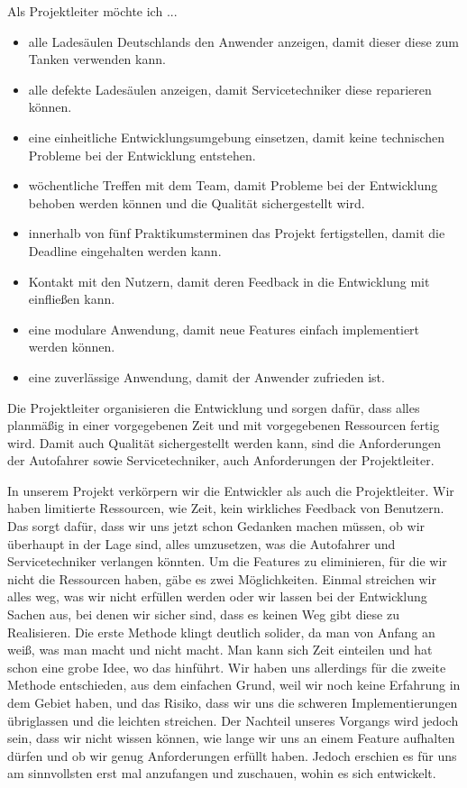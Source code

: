 \documentclass[utf8]{lni}
\begin{document}
Als Projektleiter möchte ich ...

\begin{itemize}
	\item alle Ladesäulen Deutschlands den Anwender anzeigen, damit dieser diese zum Tanken verwenden kann.
	\item alle defekte Ladesäulen anzeigen, damit Servicetechniker diese reparieren können.
	\item eine einheitliche Entwicklungsumgebung einsetzen, damit keine technischen Probleme bei der Entwicklung entstehen.
	\item wöchentliche Treffen mit dem Team, damit Probleme bei der Entwicklung behoben werden können und die Qualität sichergestellt wird.
	\item innerhalb von fünf Praktikumsterminen das Projekt fertigstellen, damit die Deadline eingehalten werden kann.
	\item Kontakt mit den Nutzern, damit deren Feedback in die Entwicklung mit einfließen kann.
	\item eine modulare Anwendung, damit neue Features einfach implementiert werden können.
	\item eine zuverlässige Anwendung, damit der Anwender zufrieden ist.
\end{itemize}

Die Projektleiter organisieren die Entwicklung und sorgen dafür, dass alles planmäßig in einer vorgegebenen Zeit und mit vorgegebenen Ressourcen fertig wird. Damit auch Qualität sichergestellt werden kann, sind die Anforderungen der Autofahrer sowie Servicetechniker, auch Anforderungen der Projektleiter.

In unserem Projekt verkörpern wir die Entwickler als auch die Projektleiter. Wir haben limitierte Ressourcen, wie Zeit, kein wirkliches Feedback von Benutzern. Das sorgt dafür, dass wir uns jetzt schon Gedanken machen müssen, ob wir überhaupt in der Lage sind, alles umzusetzen, was die Autofahrer und Servicetechniker verlangen könnten.
Um die Features zu eliminieren, für die wir nicht die Ressourcen haben, gäbe es zwei Möglichkeiten. Einmal streichen wir alles weg, was wir nicht erfüllen werden oder wir lassen bei der Entwicklung Sachen aus, bei denen wir sicher sind, dass es keinen Weg gibt diese zu Realisieren.
Die erste Methode klingt deutlich solider, da man von Anfang an weiß, was man macht und nicht macht. Man kann sich Zeit einteilen und hat schon eine grobe Idee, wo das hinführt. Wir haben uns allerdings für die zweite Methode entschieden, aus dem einfachen Grund, weil wir noch keine Erfahrung in dem Gebiet haben, und das Risiko, dass wir uns die schweren Implementierungen übriglassen und die leichten streichen. Der Nachteil unseres Vorgangs wird jedoch sein, dass wir nicht wissen können, wie lange wir uns an einem Feature aufhalten dürfen und ob wir genug Anforderungen erfüllt haben. Jedoch erschien es für uns am sinnvollsten erst mal anzufangen und zuschauen, wohin es sich entwickelt.
\end{document}
